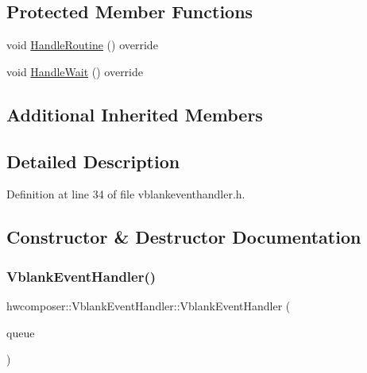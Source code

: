 \subsection*{Protected Member Functions}
\begin{DoxyCompactItemize}
\item 
void \mbox{\hyperlink{classhwcomposer_1_1VblankEventHandler_a229ed2c06dc41d88000fdebcc3dd81f9}{Handle\+Routine}} () override
\item 
void \mbox{\hyperlink{classhwcomposer_1_1VblankEventHandler_a567c783bd9baa74b99fdf4ae98fe25b1}{Handle\+Wait}} () override
\end{DoxyCompactItemize}
\subsection*{Additional Inherited Members}


\subsection{Detailed Description}


Definition at line 34 of file vblankeventhandler.\+h.



\subsection{Constructor \& Destructor Documentation}
\mbox{\label{classhwcomposer_1_1VblankEventHandler_ae031bcb80ff6c29fa63ec7725e94016c}} 
\subsubsection{\texorpdfstring{Vblank\+Event\+Handler()}{VblankEventHandler()}}
{\footnotesize\ttfamily hwcomposer\+::\+Vblank\+Event\+Handler\+::\+Vblank\+Event\+Handler (\begin{DoxyParamCaption}\item[{\mbox{\hyperlink{classhwcomposer_1_1DisplayQueue}{Display\+Queue}} $\ast$}]{queue }\end{DoxyParamCaption})}



